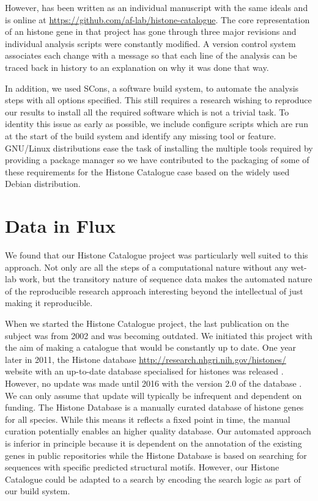 However,
 has been written as an individual
manuscript with the same ideals and is online at
\url{https://github.com/af-lab/histone-catalogue}.  The core
representation of an histone gene in that project has gone through
three major revisions and individual analysis scripts were constantly
modified.  A version control system associates each change with a
message so that each line of the analysis can be traced back in
history to an explanation on why it was done that way.

In addition, we used SCons, a software build system, to automate the analysis
steps with all options specified.  This still requires a research
wishing to reproduce
our results to install all the required software which is not a
trivial task.  To identity this issue as early as possible, we include
configure scripts which are run at the start of the build system and
identify any missing tool or feature.  GNU/Linux distributions ease
the task of installing the multiple tools required by providing a
package manager so we have contributed to the packaging of
some of these requirements for the Histone Catalogue case based on the
widely used Debian distribution.


\section{Data in Flux}

We found that our Histone Catalogue project was particularly well suited
to this approach.  Not only are all the steps of a computational
nature without any wet-lab work, but the transitory nature of sequence data
makes the automated nature of the reproducible research approach interesting
beyond the intellectual of just making it reproducible.

When we started the Histone Catalogue project, the last publication on
the subject was from 2002 and was becoming outdated.  We initiated
this project with the aim of making a catalogue that would be
constantly up to date.  One year later in 2011, the Histone database
\url{http://research.nhgri.nih.gov/histones/}
website with an up-to-date database specialised for histones
was released \citep{histonedb-2011}.
However, no update was made until 2016 with the version 2.0 of
the database \citep{histonedb-2016}.
We can only assume that update will typically
be infrequent and dependent on funding.
The Histone Database is a manually curated database of histone
genes for all species.  While this means it reflects a fixed point in time,
the manual curation potentially enables an higher quality database.
Our automated
approach is inferior in principle because it is dependent on the
annotation of the existing genes in public repositories
while the Histone Database is based on searching for
sequences with specific predicted structural motifs.  However, our
Histone Catalogue could be adapted to a search by
encoding the search logic as part of our build system.

